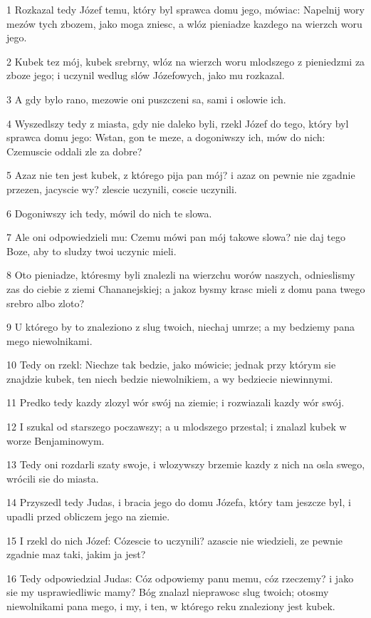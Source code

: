\par 1 Rozkazal tedy Józef temu, który byl sprawca domu jego, mówiac: Napelnij wory mezów tych zbozem, jako moga zniesc, a wlóz pieniadze kazdego na wierzch woru jego.
\par 2 Kubek tez mój, kubek srebrny, wlóz na wierzch woru mlodszego z pieniedzmi za zboze jego; i uczynil wedlug slów Józefowych, jako mu rozkazal.
\par 3 A gdy bylo rano, mezowie oni puszczeni sa, sami i oslowie ich.
\par 4 Wyszedlszy tedy z miasta, gdy nie daleko byli, rzekl Józef do tego, który byl sprawca domu jego: Wstan, gon te meze, a dogoniwszy ich, mów do nich: Czemuscie oddali zle za dobre?
\par 5 Azaz nie ten jest kubek, z którego pija pan mój? i azaz on pewnie nie zgadnie przezen, jacyscie wy? zlescie uczynili, coscie uczynili.
\par 6 Dogoniwszy ich tedy, mówil do nich te slowa.
\par 7 Ale oni odpowiedzieli mu: Czemu mówi pan mój takowe slowa? nie daj tego Boze, aby to sludzy twoi uczynic mieli.
\par 8 Oto pieniadze, któresmy byli znalezli na wierzchu worów naszych, odnieslismy zas do ciebie z ziemi Chananejskiej; a jakoz bysmy krasc mieli z domu pana twego srebro albo zloto?
\par 9 U którego by to znaleziono z slug twoich, niechaj umrze; a my bedziemy pana mego niewolnikami.
\par 10 Tedy on rzekl: Niechze tak bedzie, jako mówicie; jednak przy którym sie znajdzie kubek, ten niech bedzie niewolnikiem, a wy bedziecie niewinnymi.
\par 11 Predko tedy kazdy zlozyl wór swój na ziemie; i rozwiazali kazdy wór swój.
\par 12 I szukal od starszego poczawszy; a u mlodszego przestal; i znalazl kubek w worze Benjaminowym.
\par 13 Tedy oni rozdarli szaty swoje, i wlozywszy brzemie kazdy z nich na osla swego, wrócili sie do miasta.
\par 14 Przyszedl tedy Judas, i bracia jego do domu Józefa, który tam jeszcze byl, i upadli przed obliczem jego na ziemie.
\par 15 I rzekl do nich Józef: Cózescie to uczynili? azascie nie wiedzieli, ze pewnie zgadnie maz taki, jakim ja jest?
\par 16 Tedy odpowiedzial Judas: Cóz odpowiemy panu memu, cóz rzeczemy? i jako sie my usprawiedliwic mamy? Bóg znalazl nieprawosc slug twoich; otosmy niewolnikami pana mego, i my, i ten, w którego reku znaleziony jest kubek.
